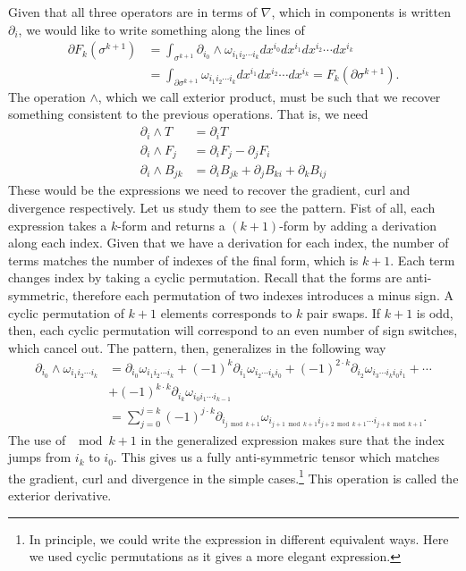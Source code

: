 Given that all three operators are in terms of $\nabla$, which in components is written $\partial_i$, we would like to write something along the lines of 
\begin{equation}\label{rp-cm-dg-generalizedStokes}
	\begin{aligned}
		\partial F_k(\sigma^{k+1}) &=\int_{\sigma^{k+1}} \partial_{i_0} \wedge \omega_{i_1 i_2 \cdots i_k} dx^{i_0} dx^{i_1} dx^{i_2} \cdots dx^{i_k} \\
		&= \int_{\partial \sigma^{k+1}} \omega_{i_1 i_2 \cdots i_k} dx^{i_1} dx^{i_2} \cdots dx^{i_k} = F_k(\partial \sigma^{k+1}).
	\end{aligned}
\end{equation}
The operation $\wedge$, which we call exterior product, must be such that we recover something consistent to the previous operations. That is, we need
\begin{equation}
	\begin{aligned}
		\partial_i \wedge T &= \partial_i T \\
		\partial_i \wedge F_j &= \partial_i F_j - \partial_j F_i \\
		\partial_i \wedge B_{jk} &= \partial_{i} B_{jk} + \partial_{j} B_{ki} + \partial_{k} B_{ij} 
	\end{aligned}
\end{equation}
These would be the expressions we need to recover the gradient, curl and divergence respectively. Let us study them to see the pattern. Fist of all, each expression takes a $k$-form and returns a $(k+1)$-form by adding a derivation along each index. Given that we have a derivation for each index, the number of terms matches the number of indexes of the final form, which is $k+1$. Each term changes index by taking a cyclic permutation. Recall that the forms are anti-symmetric, therefore each permutation of two indexes introduces a minus sign. A cyclic permutation of $k+1$ elements corresponds to $k$ pair swaps. If $k+1$ is odd, then, each cyclic permutation will correspond to an even number of sign switches, which cancel out. The pattern, then, generalizes in the following way
\begin{equation}
	\begin{aligned}
		\partial_{i_0} \wedge \omega_{i_1 i_2 \cdots i_k} &= \partial_{i_0} \omega_{i_1 i_2 \cdots i_k} + (-1)^{k} \partial_{i_1} \omega_{i_2 \cdots i_k i_0} + (-1)^{2\cdot k} \partial_{i_2} \omega_{i_3 \cdots i_k i_0 i_1} + \cdots \\
		&+ (-1)^{k\cdot k} \partial_{i_k} \omega_{i_0 i_1 \cdots i_{k-1}} \\
		&= \sum_{j=0}^{j=k} (-1)^{j\cdot k} \partial_{i_{j \bmod k+1}} \omega_{i_{j+1 \bmod k+1} i_{j+2 \bmod k+1} \cdots i_{j+k \bmod k+1}}.
	\end{aligned}
\end{equation}
The use of $\mod k+1$ in the generalized expression makes sure that the index jumps from $i_k$ to $i_0$. This gives us a fully anti-symmetric tensor which matches the gradient, curl and divergence in the simple cases.\footnote{In principle, we could write the expression in different equivalent ways. Here we used cyclic permutations as it gives a more elegant expression.} This operation is called the exterior derivative.

